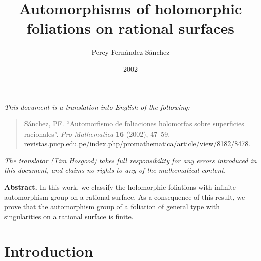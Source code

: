 \documentclass[british]{article}
\title{Automorphisms of holomorphic foliations on rational surfaces}
\author{Percy Fernández Sánchez}
\date{2002}
\newenvironment{rmenv}[1]
  {\phantomsection\par\smallskip\noindent\textbf{#1.}\rmfamily}
  {\par\smallskip}
\begin{document}
\maketitle
\thispagestyle{fancy}

\setcounter{footnote}{0}



\emph{This document is a translation into English of the following:}

\begin{quote}
Sánchez, PF. ``Automorfismo de foliaciones holomorfas sobre superficies
racionales''. \emph{Pro Mathematica} \textbf{16} (2002), 47--59.
\href{https://revistas.pucp.edu.pe/index.php/promathematica/article/view/8182/8478}{revistas.pucp.edu.pe/index.php/promathematica/article/view/8182/8478}.
\end{quote}

\emph{The translator (\href{https://thosgood.net}{Tim Hosgood}) takes
full responsibility for any errors introduced in this document, and
claims no rights to any of the mathematical content.}

\tableofcontents

\providecommand{\scr}[1]{{\mathscr{#1}}}
\renewcommand{\cal}[1]{{\mathcal{#1}}}
\renewcommand{\frak}[1]{{\mathfrak{#1}}}
\renewcommand{\geq}{\geqslant}
\renewcommand{\leq}{\leqslant}

\providecommand{\ZZ}{\mathbb{Z}}
\providecommand{\QQ}{\mathbb{Q}}
\providecommand{\CC}{\mathbb{C}}
\providecommand{\PP}{\mathbb{P}}
\providecommand{\id}{\mathrm{id}}
\providecommand{\dd}{\mathrm{d}}

\providecommand{\Sing}{\operatorname{Sing}}
\providecommand{\tang}{\operatorname{tang}}
\providecommand{\Aut}{\operatorname{Aut}}
\providecommand{\CS}{\operatorname{CS}}
\providecommand{\Kod}{\operatorname{Kod}}
\providecommand{\PGL}{\operatorname{PGL}}
\providecommand{\GL}{\operatorname{GL}}
\providecommand{\PSL}{\operatorname{PSL}}
\providecommand{\gl}{\operatorname{gl}}

\protect{}\label{abstract}
\begin{rmenv}{Abstract}
In this work, we classify the holomorphic foliations with infinite
automorphism group on a rational surface. As a consequence of this
result, we prove that the automorphism group of a foliation of general
type with singularities on a rational surface is finite.

\end{rmenv}

\section{Introduction}\label{introduction}
\end{document}
